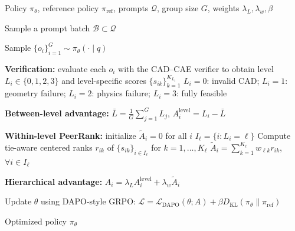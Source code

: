 \begin{algorithm}[h]
\caption{\textbf{Hierarchical Balanced GRPO.}}
\label{alg:hierarchical_grpo}
\begin{algorithmic}[1]
\REQUIRE Policy $\pi_\theta$, reference policy $\pi_{\mathrm{ref}}$,
prompts $\mathcal{Q}$, group size $G$, weights $\lambda_L,\lambda_w,\beta$

    \STATE Sample a prompt batch $\mathcal{B}\subset\mathcal{Q}$

        \STATE Sample $\{o_i\}_{i=1}^{G}\sim\pi_\theta(\cdot\mid q)$

        \STATE \textbf{Verification:}
        evaluate each $o_i$ with the CAD--CAE verifier to obtain
        level $L_i\in\{0,1,2,3\}$ and level-specific scores
        $\{s_{ik}\}_{k=1}^{K_{L_i}}$
        \STATE \hspace{\algorithmicindent}
        $L_i=0$: invalid CAD;\;
        $L_i=1$: geometry failure;\;
        $L_i=2$: physics failure;\;
        $L_i=3$: fully feasible

        \STATE \textbf{Between-level advantage:}
        $\bar L=\frac{1}{G}\sum_{j=1}^{G}L_j$,\quad
        $A_i^{\mathrm{level}}=L_i-\bar L$

        \STATE \textbf{Within-level PeerRank:}
        initialize $\widetilde A_i=0$ for all $i$
            \STATE $I_\ell=\{i:L_i=\ell\}$
                \STATE Compute tie-aware centered ranks
                $r_{ik}$ of $\{s_{ik}\}_{i\in I_\ell}$
                for $k=1,\ldots,K_\ell$
                \STATE $\widetilde A_i
                =\sum_{k=1}^{K_\ell}w_{\ell k}r_{ik}$,
                \quad $\forall i\in I_\ell$
            \ENDIF
        \ENDFOR

        \STATE \textbf{Hierarchical advantage:}\quad
        $A_i=\lambda_L A_i^{\mathrm{level}}
        +\lambda_w\widetilde A_i$
    \ENDFOR

    \STATE Update $\theta$ using DAPO-style GRPO:
    $\mathcal{L}
    =\mathcal{L}_{\mathrm{DAPO}}(\theta;A)
    +\beta D_{\mathrm{KL}}(\pi_\theta\|\pi_{\mathrm{ref}})$
\ENDFOR

\RETURN Optimized policy $\pi_\theta$
\end{algorithmic}
\end{algorithm}
